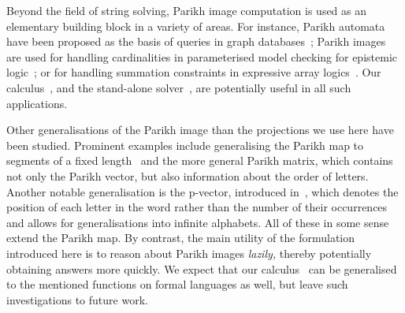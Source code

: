 Beyond the field of string solving, Parikh image computation is used
as an elementary building block in a variety of areas.  For instance,
Parikh automata have been proposed as the basis of queries in graph
databases~\cite{graph-queries}; Parikh images are used for handling
cardinalities in parameterised model checking for epistemic
logic~\cite{epistemic-logic}; or for handling summation constraints in
expressive array logics~\cite{rodrigoRaya}. Our calculus~\Calculus{},
and the stand-alone solver~\Catra{},
are potentially useful in all such applications.

Other generalisations of the Parikh image than the projections we use here
have been studied. Prominent examples include generalising the Parikh map to
segments of a fixed length~\cite{KARHUMAKI1980155} and the more general Parikh
matrix, which contains not only the Parikh vector, but also information about
the order of letters. Another notable generalisation is the p-vector, introduced
in~\cite{infinite-words}, which denotes the position of each letter in the word
rather than the number of their occurrences and allows for generalisations into
infinite alphabets. All of these in some sense extend the Parikh map. By
contrast, the main utility of the formulation introduced here is to reason
about Parikh images \emph{lazily,}
thereby potentially obtaining answers more quickly. We expect that our
calculus~\Calculus{} can be generalised to the mentioned functions on
formal languages as well, but leave such investigations to future work.


